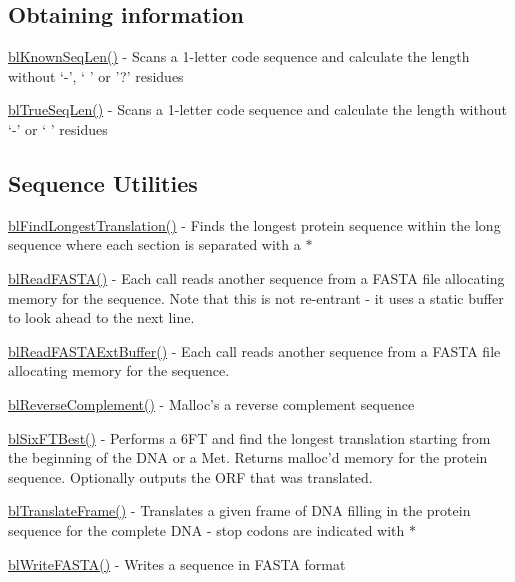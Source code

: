 \subsection*{Obtaining information }


\begin{DoxyItemize}
\item \hyperlink{_known_seq_len_8c_a458ac08b1ca2e18cdca58412b48a59af}{bl\-Known\-Seq\-Len()} -\/ Scans a 1-\/letter code sequence and calculate the length without `-\/', ` ' or '?' residues
\item \hyperlink{seq_8h_ac0b588fc17073612af3c544bba8d1044}{bl\-True\-Seq\-Len()} -\/ Scans a 1-\/letter code sequence and calculate the length without `-\/' or ` ' residues
\end{DoxyItemize}

\subsection*{Sequence Utilities }


\begin{DoxyItemize}
\item \hyperlink{sequtil_8c_a14243958a63fe950b33751f9fd869bdf}{bl\-Find\-Longest\-Translation()} -\/ Finds the longest protein sequence within the long sequence where each section is separated with a $\ast$
\item \hyperlink{sequtil_8c_adeac6f6b4733e0f90508ef56bb06ff13}{bl\-Read\-F\-A\-S\-T\-A()} -\/ Each call reads another sequence from a F\-A\-S\-T\-A file allocating memory for the sequence. Note that this is not re-\/entrant -\/ it uses a static buffer to look ahead to the next line.
\item \hyperlink{sequtil_8c_a75c219dbcdca061783a26233ad7c0723}{bl\-Read\-F\-A\-S\-T\-A\-Ext\-Buffer()} -\/ Each call reads another sequence from a F\-A\-S\-T\-A file allocating memory for the sequence.
\item \hyperlink{sequtil_8c_ac4717c09e6b624508c2a36a9b77b210e}{bl\-Reverse\-Complement()} -\/ Malloc's a reverse complement sequence
\item \hyperlink{sequtil_8c_a35f659dd77c18c95822d35424be303cf}{bl\-Six\-F\-T\-Best()} -\/ Performs a 6\-F\-T and find the longest translation starting from the beginning of the D\-N\-A or a Met. Returns malloc'd memory for the protein sequence. Optionally outputs the O\-R\-F that was translated.
\item \hyperlink{sequtil_8c_a1a7fdd4e4f5ba19fa47b1191d2b3f712}{bl\-Translate\-Frame()} -\/ Translates a given frame of D\-N\-A filling in the protein sequence for the complete D\-N\-A -\/ stop codons are indicated with $\ast$
\item \hyperlink{sequtil_8c_ac111bbccdde0b09afd455f7a6fc95130}{bl\-Write\-F\-A\-S\-T\-A()} -\/ Writes a sequence in F\-A\-S\-T\-A format
\end{DoxyItemize}

